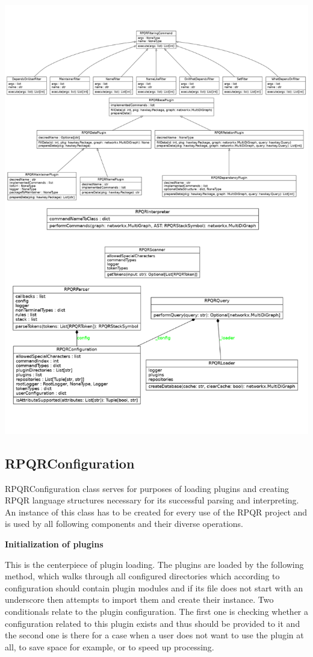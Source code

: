 \includegraphics[scale=0.7]{obrazky-figures/class_diagram.png}

\subsection*{RPQRConfiguration}
RPQRConfiguration class serves for purposes of loading plugins and creating RPQR language structures
necessary for its successful parsing and interpreting. An instance of this class has to be created for
every use of the RPQR project and is used by all following components and their diverse operations.

\textbf{Initialization of plugins}

This is the centerpiece of plugin loading. The plugins are loaded by the following method, which walks through all configured directories
which according to configuration should contain plugin modules and if its file does not start with
an underscore then attempts to import them and create their instance. Two conditionals relate to the plugin configuration. The first one is checking whether a configuration related to
this plugin exists and thus should be provided to it and the second one is there for a case when
a user does not want to use the plugin at all, to save space for example, or to speed up processing.

